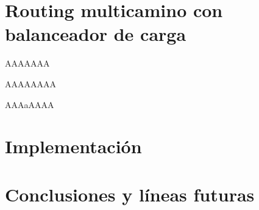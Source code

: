 \documentclass[10pt,spanish,xcolor={svgnames}]{beamer}
\begin{document}
\section{Routing multicamino con balanceador de carga}
\begin{frame}{AAAAAAA}
\vspace*{-2em}
\end{frame}

\begin{frame}{AAAAAAAA}
\vspace*{-2em}
\end{frame}

\begin{frame}{AAAaAAAA}
\vspace*{-2em}
\end{frame}

\section{Implementación}
\section{Conclusiones y líneas futuras}
\end{document}

